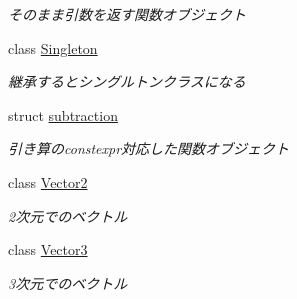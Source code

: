 \begin{DoxyCompactItemize}
\begin{DoxyCompactList}\small\item\em そのまま引数を返す関数オブジェクト \end{DoxyCompactList}\item 
class \mbox{\hyperlink{classsaki_1_1_singleton}{Singleton}}
\begin{DoxyCompactList}\small\item\em 継承するとシングルトンクラスになる \end{DoxyCompactList}\item 
struct \mbox{\hyperlink{structsaki_1_1subtraction}{subtraction}}
\begin{DoxyCompactList}\small\item\em 引き算のconstexpr対応した関数オブジェクト \end{DoxyCompactList}\item 
class \mbox{\hyperlink{classsaki_1_1_vector2}{Vector2}}
\begin{DoxyCompactList}\small\item\em 2次元でのベクトル \end{DoxyCompactList}\item 
class \mbox{\hyperlink{classsaki_1_1_vector3}{Vector3}}
\begin{DoxyCompactList}\small\item\em 3次元でのベクトル \end{DoxyCompactList}\end{DoxyCompactItemize}
